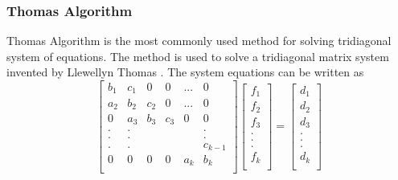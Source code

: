 \documentclass[12pt, oneside]{book}
\theoremstyle{plain}
\theoremstyle{definition}
\begin{document}
\subsubsection{Thomas Algorithm}
Thomas Algorithm is the most commonly used method for solving tridiagonal system of equations. The method is used to solve a tridiagonal matrix system invented by Llewellyn Thomas \cite{thomas}. The system equations can be written as
$$
\begin{bmatrix}  
b_1 & c_1 & 0 & 0 & ... & 0 \\ 
a_2 & b_2 & c_2 & 0 & ... & 0 \\ 
0 & a_3 & b_3 & c_3 & 0 & 0 \\ 
. & . &  &  &  & . \\ 
. & . &  &  &  & . \\ 
. & . &  &  &  & c_{k-1} \\ 
0 & 0 & 0 & 0 & a_k & b_k \\ 
\end{bmatrix} \begin{bmatrix}  
f_1 \\ 
f_2 \\ 
f_3 \\ 
.\\ 
.\\ 
.\\ 
f_k \\ 
\end{bmatrix} = \begin{bmatrix} 
d_1 \\ 
d_2 \\ 
d_3 \\ 
.\\ 
.\\ 
.\\ 
d_k \\ 
\end{bmatrix}
$$
\end{document}
